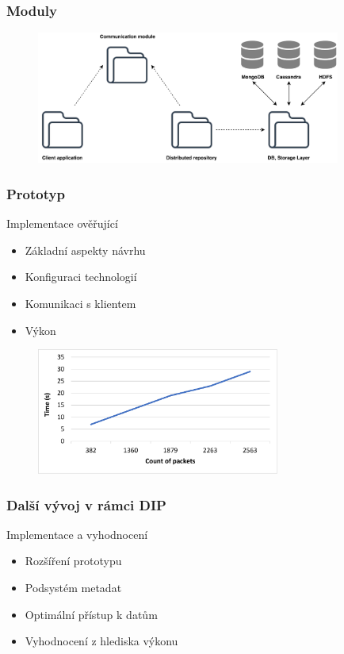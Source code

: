 \documentclass[10pt,xcolor=pdflatex]{beamer}
\begin{document}
\begin{frame}\frametitle{Moduly}
\begin{figure}[!h]
  \centering
  \includegraphics[width=10cm]{img/Module_dependency.pdf}
  \label{FIG_PerformanceChart}
\end{figure}
\end{frame}



\begin{frame}\frametitle{Prototyp}
\begin{block}{Implementace ověřující}
    \begin{itemize}
        \item Základní aspekty návrhu
        \item Konfiguraci technologií
        \item Komunikaci s klientem
        \item Výkon
    \end{itemize}
\end{block}

\begin{figure}[!h]
  \centering
  \includegraphics[width=8cm]{img/PerformanceChart.pdf}
  \label{FIG_PerformanceChart}
\end{figure}
\end{frame}


\begin{frame}\frametitle{Další vývoj v rámci DIP}
\begin{block}{Implementace a vyhodnocení}
    \begin{itemize}
        \item Rozšíření prototypu
        \item Podsystém metadat
        \item Optimální přístup k datům
        \item Vyhodnocení z hlediska výkonu
    \end{itemize}
\end{block}
\end{frame}


\end{document}
